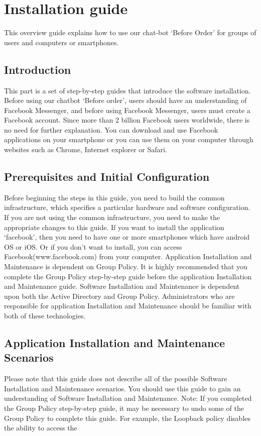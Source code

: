 \section{Installation guide}

This overview guide explains how to use our chat-bot ‘Before Order’ for groups of users and computers or smartphones. \newline

\subsection{Introduction} 
 This part is a set of step-by-step guides that introduce the software installation. Before using our chatbot ‘Before order’, users should have an understanding of Facebook Messenger, and before using Facebook Messenger, users must create a Facebook account. Since more than 2 billion Facebook users worldwide, there is no need for further explanation. You can download and use Facebook applications on your smartphone or you can use them on your computer through websites such as Chrome, Internet explorer or Safari.\newline

\subsection{Prerequisites and Initial Configuration}
 Before beginning the steps in this guide, you need to build the common infrastructure, which specifies a particular hardware and software configuration. If you are not using the common infrastructure, you need to make the appropriate changes to this guide. If you want to install the application ‘facebook’, then you need to have one or more smartphones which have android OS or iOS. Or if you don't want to install, you can access Facebook(www.facebook.com) from your computer. 
 Application Installation and Maintenance is dependent on Group Policy. It is highly recommended that you complete the Group Policy step-by-step guide before the application Installation and Maintenance guide. 
Software Installation and Maintenance is dependent upon both the Active Directory and Group Policy. Administrators who are responsible for application Installation and Maintenance should be familiar with both of these technologies. \newline

\subsection{Application Installation and Maintenance Scenarios}
Please note that this guide does not describe all of the possible Software Installation and Maintenance scenarios. You should use this guide to gain an understanding of Software Installation and Maintenance. 
Note: If you completed the Group Policy step-by-step guide, it may be necessary to undo some of the Group Policy to complete this guide. For example, the Loopback policy disables the ability to access the 